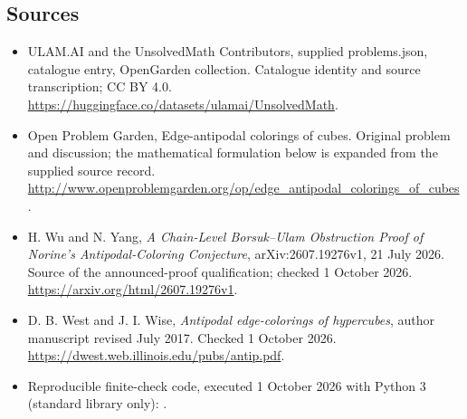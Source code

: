 \documentclass[11pt,a4paper]{article}
\begin{document}
\subsection{Sources}
\begin{itemize}
\item[S1] ULAM.AI and the UnsolvedMath Contributors, supplied problems.json, catalogue entry, OpenGarden collection. Catalogue identity and source transcription; CC BY 4.0.
\url{https://huggingface.co/datasets/ulamai/UnsolvedMath}.
\item[S2] Open Problem Garden, Edge-antipodal colorings of cubes. Original problem and discussion; the mathematical formulation below is expanded from the supplied source record.
\url{http://www.openproblemgarden.org/op/edge_antipodal_colorings_of_cubes}.
\item[S3] H. Wu and N. Yang, \emph{A Chain-Level Borsuk--Ulam Obstruction Proof of Norine's Antipodal-Coloring Conjecture}, arXiv:2607.19276v1, 21 July 2026. Source of the announced-proof qualification; checked 1 October 2026.
\url{https://arxiv.org/html/2607.19276v1}.
\item[S4] D. B. West and J. I. Wise, \emph{Antipodal edge-colorings of hypercubes}, author manuscript revised July 2017. Checked 1 October 2026.
\url{https://dwest.web.illinois.edu/pubs/antip.pdf}.
\item[C1] Reproducible finite-check code, executed 1 October 2026 with Python 3 (standard library only):
.
\end{itemize}
\end{document}
